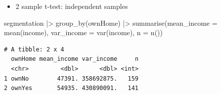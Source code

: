 \documentclass[
  ignorenonframetext,
]{beamer}
\newenvironment{Shaded}{\begin{snugshade}}{\end{snugshade}}
\newcommand{\AttributeTok}[1]{\textcolor[rgb]{0.40,0.45,0.13}{#1}}
\newcommand{\FunctionTok}[1]{\textcolor[rgb]{0.28,0.35,0.67}{#1}}
\newcommand{\NormalTok}[1]{\textcolor[rgb]{0.00,0.23,0.31}{#1}}
\newcommand{\SpecialCharTok}[1]{\textcolor[rgb]{0.37,0.37,0.37}{#1}}
\providecommand{\tightlist}{%
  \setlength{\itemsep}{0pt}\setlength{\parskip}{0pt}}\usepackage{longtable,booktabs,array}
\begin{document}
\begin{frame}[fragile]{}
\label{section-15}
\begin{itemize}
\tightlist
\item
  2 sample t-test: independent samples
\end{itemize}

\tiny

\begin{Shaded}
\begin{Highlighting}[]
\NormalTok{segmentation }\SpecialCharTok{|\textgreater{}} 
  \FunctionTok{group\_by}\NormalTok{(ownHome) }\SpecialCharTok{|\textgreater{}} 
  \FunctionTok{summarise}\NormalTok{(}\AttributeTok{mean\_income =} \FunctionTok{mean}\NormalTok{(income),}
            \AttributeTok{var\_income =} \FunctionTok{var}\NormalTok{(income),}
            \AttributeTok{n =} \FunctionTok{n}\NormalTok{())}
\end{Highlighting}
\end{Shaded}

\begin{verbatim}
# A tibble: 2 x 4
  ownHome mean_income var_income     n
  <chr>         <dbl>      <dbl> <int>
1 ownNo        47391. 358692875.   159
2 ownYes       54935. 430890091.   141
\end{verbatim}
\end{frame}
\end{document}
